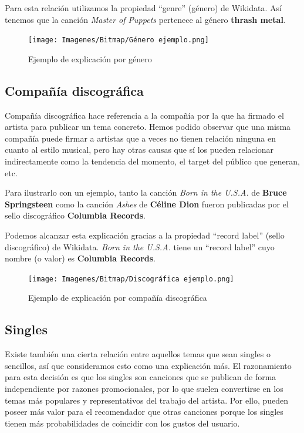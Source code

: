 Para esta relación utilizamos la propiedad ``genre'' (género) de Wikidata. Así tenemos que la canción \textit{Master of Puppets} pertenece al género \textbf{thrash metal}.\\

\begin{figure}[h!]
	\centering
	\texttt{[image: Imagenes/Bitmap/Género ejemplo.png]}
	\caption{Ejemplo de explicación por género}
	\label{fig:sampleImage}
\end{figure}

\subsection*{Compañía discográfica}

Compañía discográfica hace referencia a la compañía por la que ha firmado el artista para publicar un tema concreto. Hemos podido observar que una misma compañía puede firmar a artistas que a veces no tienen relación ninguna en cuanto al estilo musical, pero hay otras causas que sí los pueden relacionar indirectamente como la tendencia del momento, el target del público que generan, etc.

Para ilustrarlo con un ejemplo, tanto la canción \textit{Born in the U.S.A.} de \textbf{Bruce Springsteen} como la canción \textit{Ashes} de \textbf{Céline Dion} fueron publicadas por el sello discográfico \textbf{Columbia Records}.

Podemos alcanzar esta explicación gracias a la propiedad ``record label'' (sello discográfico) de Wikidata. \textit{Born in the U.S.A.} tiene un ``record label'' cuyo nombre (o valor) es \textbf{Columbia Records}.\\

\begin{figure}[h!]
	\centering
	\texttt{[image: Imagenes/Bitmap/Discográfica ejemplo.png]}
	\caption{Ejemplo de explicación por compañía discográfica}
	\label{fig:sampleImage}
\end{figure}

\subsection*{Singles}

Existe también una cierta relación entre aquellos temas que sean singles o sencillos, así que consideramos esto como una explicación más. El razonamiento para esta decisión es que los singles son canciones que se publican de forma independiente por razones promocionales, por lo que suelen convertirse en los temas más populares y representativos del trabajo del artista. Por ello, pueden poseer más valor para el recomendador que otras canciones porque los singles tienen más probabilidades de coincidir con los gustos del usuario.

